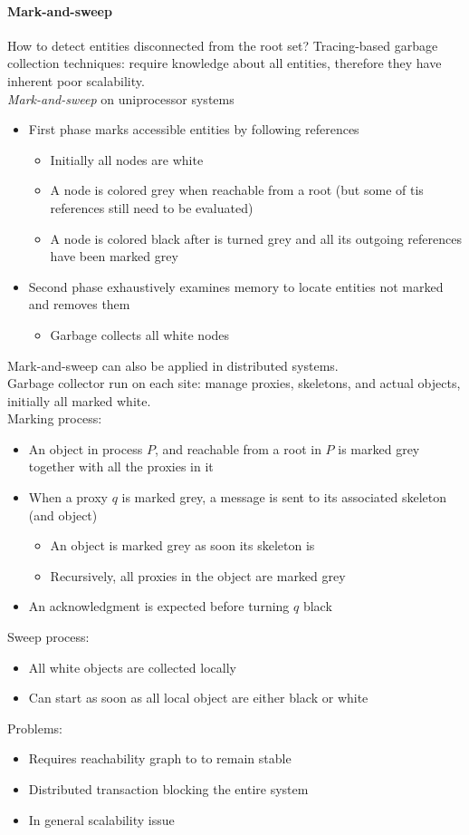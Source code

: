 \documentclass[10pt,a4paper]{article}
\begin{document}
\paragraph{Mark-and-sweep}
How to detect entities disconnected from the root set?
Tracing-based garbage collection techniques: require knowledge about all entities, therefore they have inherent poor scalability. \\
\textit{Mark-and-sweep} on uniprocessor systems
\begin{itemize}
	\item First phase marks accessible entities by following references
	\begin{itemize}
		\item Initially all nodes are white
		\item A node is colored grey when reachable from a root (but some of tis references still need to be evaluated)
		\item A node is colored black after is turned grey and all its outgoing references have been marked grey
	\end{itemize}
	\item Second phase exhaustively examines memory to locate entities not marked and removes them
	\begin{itemize}
		\item Garbage collects all white nodes
	\end{itemize}
\end{itemize}
Mark-and-sweep can also be applied in distributed systems. \\
Garbage collector run on each site: manage proxies, skeletons, and actual objects, initially all marked white. \\
Marking process:
\begin{itemize}
	\item An object in process $P$, and reachable from a root in $P$ is marked grey together with all the proxies in it
	\item When a proxy $q$ is marked grey, a message is sent to its associated skeleton (and object)
	\begin{itemize}
		\item An object is marked grey as soon its skeleton is
		\item Recursively, all proxies in the object are marked grey
	\end{itemize}
	\item An acknowledgment is expected before turning $q$ black
\end{itemize}
Sweep process:
\begin{itemize}
	\item All white objects are collected locally
	\item Can start as soon as all local object are either black or white
\end{itemize}
Problems:
\begin{itemize}
	\item Requires reachability graph to to remain stable
	\item Distributed transaction blocking the entire system
	\item In general scalability issue
\end{itemize}
\end{document}
